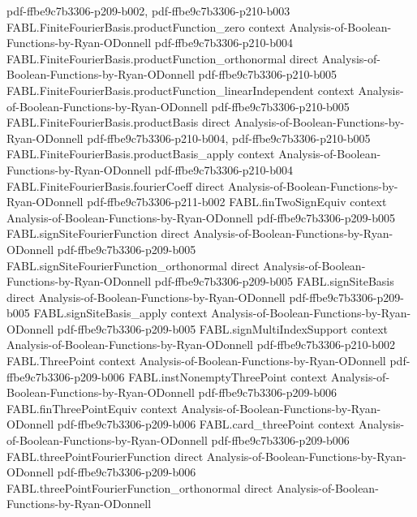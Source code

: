 \begin{theorem}
  {pdf-ffbe9c7b3306-p209-b002,
    pdf-ffbe9c7b3306-p210-b003}
\proofstep
  {FABL.FiniteFourierBasis.productFunction_zero}
  {context}
  {Analysis-of-Boolean-Functions-by-Ryan-ODonnell}
  {pdf-ffbe9c7b3306-p210-b004}
\proofstep
  {FABL.FiniteFourierBasis.productFunction_orthonormal}
  {direct}
  {Analysis-of-Boolean-Functions-by-Ryan-ODonnell}
  {pdf-ffbe9c7b3306-p210-b005}
\proofstep
  {FABL.FiniteFourierBasis.productFunction_linearIndependent}
  {context}
  {Analysis-of-Boolean-Functions-by-Ryan-ODonnell}
  {pdf-ffbe9c7b3306-p210-b005}
\proofstep
  {FABL.FiniteFourierBasis.productBasis}
  {direct}
  {Analysis-of-Boolean-Functions-by-Ryan-ODonnell}
  {pdf-ffbe9c7b3306-p210-b004,
    pdf-ffbe9c7b3306-p210-b005}
\proofstep
  {FABL.FiniteFourierBasis.productBasis_apply}
  {context}
  {Analysis-of-Boolean-Functions-by-Ryan-ODonnell}
  {pdf-ffbe9c7b3306-p210-b004}
\proofstep
  {FABL.FiniteFourierBasis.fourierCoeff}
  {direct}
  {Analysis-of-Boolean-Functions-by-Ryan-ODonnell}
  {pdf-ffbe9c7b3306-p211-b002}
\proofstep
  {FABL.finTwoSignEquiv}
  {context}
  {Analysis-of-Boolean-Functions-by-Ryan-ODonnell}
  {pdf-ffbe9c7b3306-p209-b005}
\proofstep
  {FABL.signSiteFourierFunction}
  {direct}
  {Analysis-of-Boolean-Functions-by-Ryan-ODonnell}
  {pdf-ffbe9c7b3306-p209-b005}
\proofstep
  {FABL.signSiteFourierFunction_orthonormal}
  {direct}
  {Analysis-of-Boolean-Functions-by-Ryan-ODonnell}
  {pdf-ffbe9c7b3306-p209-b005}
\proofstep
  {FABL.signSiteBasis}
  {direct}
  {Analysis-of-Boolean-Functions-by-Ryan-ODonnell}
  {pdf-ffbe9c7b3306-p209-b005}
\proofstep
  {FABL.signSiteBasis_apply}
  {context}
  {Analysis-of-Boolean-Functions-by-Ryan-ODonnell}
  {pdf-ffbe9c7b3306-p209-b005}
\proofstep
  {FABL.signMultiIndexSupport}
  {context}
  {Analysis-of-Boolean-Functions-by-Ryan-ODonnell}
  {pdf-ffbe9c7b3306-p210-b002}
\proofstep
  {FABL.ThreePoint}
  {context}
  {Analysis-of-Boolean-Functions-by-Ryan-ODonnell}
  {pdf-ffbe9c7b3306-p209-b006}
\proofstep
  {FABL.instNonemptyThreePoint}
  {context}
  {Analysis-of-Boolean-Functions-by-Ryan-ODonnell}
  {pdf-ffbe9c7b3306-p209-b006}
\proofstep
  {FABL.finThreePointEquiv}
  {context}
  {Analysis-of-Boolean-Functions-by-Ryan-ODonnell}
  {pdf-ffbe9c7b3306-p209-b006}
\proofstep
  {FABL.card_threePoint}
  {context}
  {Analysis-of-Boolean-Functions-by-Ryan-ODonnell}
  {pdf-ffbe9c7b3306-p209-b006}
\proofstep
  {FABL.threePointFourierFunction}
  {direct}
  {Analysis-of-Boolean-Functions-by-Ryan-ODonnell}
  {pdf-ffbe9c7b3306-p209-b006}
\proofstep
  {FABL.threePointFourierFunction_orthonormal}
  {direct}
  {Analysis-of-Boolean-Functions-by-Ryan-ODonnell}

\end{theorem}

